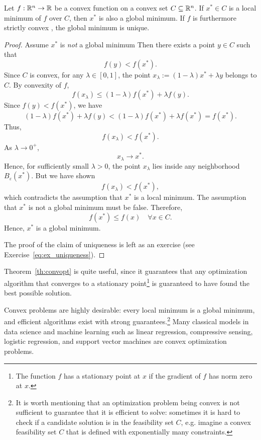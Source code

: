\begin{theorem}\label{th:convopt}
Let $f : \mathbb{R}^n \to \mathbb{R}$ be a convex function on a convex set $C \subseteq \mathbb{R}^n$.
If $x^* \in C$ is a local minimum of $f$ over $C$, then $x^*$ is also a global minimum.
If $f$ is furthermore strictly convex%
, the global minimum is unique.
\end{theorem}

\begin{proof}
Assume $x^*$ is {\em not} a global minimum
Then there exists a point $y \in C$ such that
$$
f(y) < f(x^*).
$$
Since $C$ is convex, for any $\lambda \in [0,1]$, the point
$x_\lambda := (1-\lambda)x^* + \lambda y
$ belongs to $C$.
By convexity of $f$,
$$
f(x_\lambda)
\le
(1-\lambda)f(x^*) + \lambda f(y).
$$
Since $f(y) < f(x^*)$, we have
$$
(1-\lambda)f(x^*) + \lambda f(y)
<
(1-\lambda)f(x^*) + \lambda f(x^*) = 
f(x^*).
$$
Thus,
$$
f(x_\lambda) < f(x^*).
$$
As $\lambda \to 0^+$,
$$
x_\lambda \to x^*.
$$
Hence, for sufficiently small $\lambda > 0$, the point $x_\lambda$ lies inside any neighborhood $B_\varepsilon(x^*)$.
But we have shown
$$
f(x_\lambda) < f(x^*),
$$
which contradicts the assumption that $x^*$ is a local minimum.
The assumption that $x^*$ is not a global minimum must be false. Therefore,
$$
f(x^*) \le f(x) \quad \forall x \in C.
$$
Hence, $x^*$ is a global minimum.

The proof of the claim of uniqueness is left as an exercise (see Exercise~\ref{eq:ex_uniqueness}).



\end{proof}


Theorem~\ref{th:convopt} is quite useful, since it guarantees that any optimization algorithm that converges to a stationary point\footnote{The function $f$ has a stationary point at $x$ if the gradient of $f$ has norm zero at $x$.} is guaranteed to have found the best possible solution.




Convex problems are highly desirable: every local minimum is a global minimum, and efficient algorithms exist with strong guarantees.\footnote{It is worth mentioning that an optimization problem being convex is not sufficient to guarantee that it is efficient to solve: sometimes it is hard to check if a candidate solution is in the feasibility set $C$, e.g. imagine a convex feasibility set $C$ that is defined with exponentially many constraints.}
Many classical models in data science and machine learning  such as linear regression, compressive sensing, logistic regression, and support vector machines are convex optimization problems.

